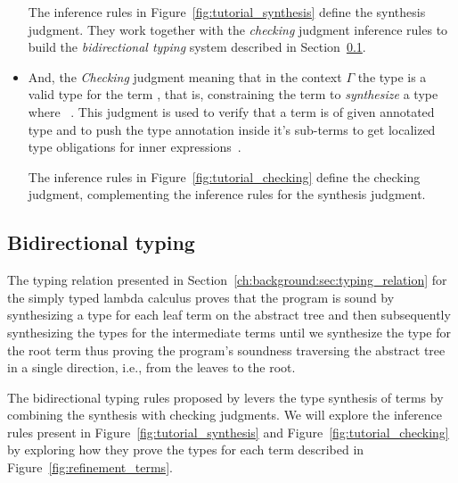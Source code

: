 \documentclass[
  oneside,
  english,
  coorientadorbanca,
  noabntexcite
]{ufsc-thesis-rn46-2019}
\newcommand{\codett}[1]{\text{\scpfamily#1}}
\newcommand{\code}[1]{\text{\scpfamily\setlength\spaceskip{0.35em}#1}}
\newcommand{\typer}[2]{\code{#1 \codett{:} #2}}
\newcommand{\ctxtr}[2]{\code{{$\Gamma$}#1 {$\vdash$} #2}}
\newcommand{\typecxr}[3]{\ctxtr{#1}{\typer{#2}{#3}}}
\newcommand{\subtyr}[2]{\code{#1 $\prec :$ #2}}
\newcommand{\checkr}[2]{\code{#1 $\Leftarrow$ #2}}
\newcommand{\checkcxr}[3]{\ctxtr{#1}{\checkr{#2}{#3}}}
\begin{document}
\begin{itemize}
        The inference rules in Figure~\ref{fig:tutorial_synthesis} define the synthesis judgment.
        They work together with the \textit{checking} judgment inference rules to build the \textit{bidirectional typing} system described in Section~\ref{sub:bidirectional_typing}.

  \item And, the \textit{Checking} judgment \checkcxr{}{e}{t} meaning that in the context $\Gamma$ the type \code{t} is a valid type for the term \code{e}, that is, constraining the term \code{e} to \textit{synthesize} a type \code{s} where \subtyr{s}{t}~\cite{jhala2020tutorial}.
        This judgment is used to verify that a term is of given annotated type and to push the type annotation inside it's sub-terms to get localized type obligations for inner expressions~\cite{jhala2020tutorial}.

        The inference rules in Figure~\ref{fig:tutorial_checking} define the checking judgment, complementing the inference rules for the synthesis judgment.
\end{itemize}

\subsection{Bidirectional typing}\label{sub:bidirectional_typing}

The typing relation \typecxr{}{x}{T} presented in Section~\ref{ch:background:sec:typing_relation} for the simply typed lambda calculus proves that the program is sound by synthesizing a type for each leaf term on the abstract tree and then subsequently synthesizing the types for the intermediate terms until we synthesize the type for the root term thus proving the program's soundness traversing the abstract tree in a single direction, i.e., from the leaves to the root.

The bidirectional typing rules proposed by \textcite{jhala2020tutorial} levers the type synthesis of terms by combining the synthesis with checking judgments.
We will explore the inference rules present in Figure~\ref{fig:tutorial_synthesis} and Figure~\ref{fig:tutorial_checking} by exploring how they prove the types for each term \code{e} described in Figure~\ref{fig:refinement_terms}.
\end{document}
